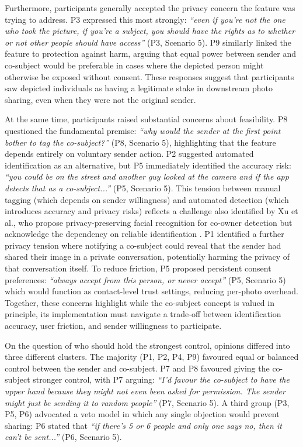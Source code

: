 Furthermore, participants generally accepted the privacy concern the feature was trying to address. P3 expressed this most strongly: \textit{``even if you're not the one who took the picture, if you're a subject, you should have the rights as to whether or not other people should have access''} (P3, Scenario 5). P9 similarly linked the feature to protection against harm, arguing that equal power between sender and co-subject would be preferable in cases where the depicted person might otherwise be exposed without consent. These responses suggest that participants saw depicted individuals as having a legitimate stake in downstream photo sharing, even when they were not the original sender.

At the same time, participants raised substantial concerns about feasibility. P8 questioned the fundamental premise: \textit{``why would the sender at the first point bother to tag the co-subject?''} (P8, Scenario 5), highlighting that the feature depends entirely on voluntary sender action. P2 suggested automated identification as an alternative, but P5 immediately identified the accuracy risk: \textit{``you could be on the street and another guy looked at the camera and if the app detects that as a co-subject...''} (P5, Scenario 5). This tension between manual tagging (which depends on sender willingness) and automated detection (which introduces accuracy and privacy risks) reflects a challenge also identified by Xu et al., who propose privacy-preserving facial recognition for co-owner detection but acknowledge the dependency on reliable identification \cite{xu_my_2017}. P1 identified a further privacy tension where notifying a co-subject could reveal that the sender had shared their image in a private conversation, potentially harming the privacy of that conversation itself. To reduce friction, P5 proposed persistent consent preferences: \textit{``always accept from this person, or never accept''} (P5, Scenario 5) which would function as contact-level trust settings, reducing per-photo overhead. Together, these concerns highlight while the co-subject concept is valued in principle, its implementation must navigate a trade-off between identification accuracy, user friction, and sender willingness to participate.

On the question of who should hold the strongest control, opinions differed into three different clusters. The majority (P1, P2, P4, P9) favoured equal or balanced control between the sender and co-subject. P7 and P8 favoured giving the co-subject stronger control, with P7 arguing: \textit{``I'd favour the co-subject to have the upper hand because they might not even been asked for permission. The sender might just be sending it to random people''} (P7, Scenario 5). A third group (P3, P5, P6) advocated a veto model in which any single objection would prevent sharing: P6 stated that \textit{``if there's 5 or 6 people and only one says no, then it can't be sent...''} (P6, Scenario 5).

